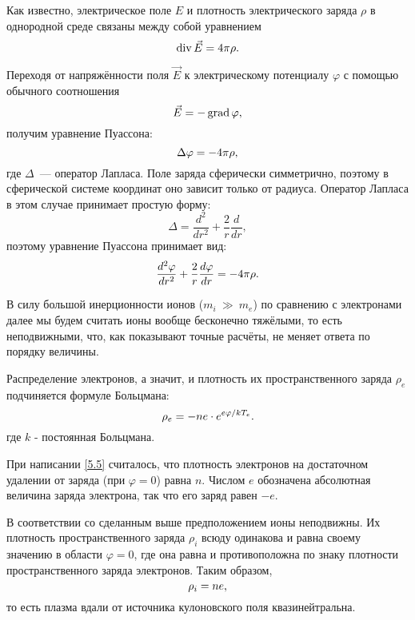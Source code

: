 Как известно, электрическое поле $E$ и плотность электрического заряда $\rho$ в однородной среде связаны между собой
уравнением
\begin{equation}
	\eqmark{5.1}
	\Div \vec{E}=4\pi\rho.
\end{equation}

Переходя от напряжённости поля $\vec{E}$ к электрическому потенциалу $\varphi$ с помощью обычного соотношения
\begin{equation}
	\eqmark{5.2}
	\vec{E}=-\Grad\varphi,
\end{equation}
получим уравнение Пуассона:
\begin{equation}
	\eqmark{5.3}
	\Delta\varphi=-4\pi\rho,
\end{equation}
где $\Delta$~--- оператор Лапласа. Поле заряда сферически симметрично, поэтому в сферической системе координат оно зависит только от радиуса. Оператор Лапласа в этом случае принимает простую форму:
\begin{equation*}
	\Delta=\frac{d^2}{dr^2}+\frac{2}{r}\frac{d}{dr},
\end{equation*}
поэтому уравнение Пуассона принимает вид:
\begin{equation}
	\eqmark{5.4}
	\frac{d^2\varphi}{dr^2}+\frac{2}{r}\frac{d\varphi}{dr}=-4\pi\rho.
\end{equation}

В силу большой инерционности ионов ($m_i~\gg~m_e$) по сравнению с электронами далее мы будем считать ионы вообще бесконечно
тяжёлыми, то есть неподвижными, что, как показывают точные расчёты, не меняет ответа по порядку величины.

Распределение электронов, а значит, и плотность их пространственного заряда $\rho_e$ подчиняется формуле Больцмана:
\begin{equation}
	\eqmark{5.5}
	\rho_e=-ne\cdot e^{e\varphi/kT_e}.
\end{equation}
где $k$ - постоянная Больцмана.

При написании \eqref{5.5} считалось, что плотность электронов на достаточном удалении от заряда (при $\varphi=0$) равна $n$.
Числом $e$ обозначена абсолютная величина заряда электрона, так что его заряд равен $-e$.

В соответствии со сделанным выше предположением ионы неподвижны. Их плотность пространственного заряда $\rho_i$ всюду одинакова и
равна своему значению в области $\varphi=0$, где она равна и противоположна по  знаку плотности пространственного заряда электронов.
Таким образом,
\begin{equation}
	\eqmark{5.6}
	\rho_i=ne ,
\end{equation}
то есть плазма вдали от источника кулоновского поля квазинейтральна. 

